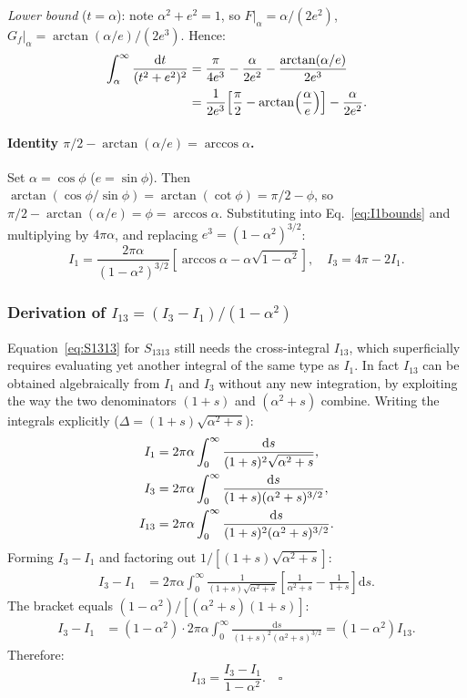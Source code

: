 \documentclass[5p,sort&compress]{elsarticle}
\begin{document}
\textit{Lower bound} ($t=\alpha$): note $\alpha^2+e^2=1$, so
$F|_\alpha=\alpha/(2e^2)$,
$G_f|_\alpha=\arctan(\alpha/e)/(2e^3)$. Hence:
\begin{align}
  \int_\alpha^\infty\frac{\mathrm dt}{(t^2+e^2)^2}
  &=\frac{\pi}{4e^3}-\frac{\alpha}{2e^2}
    -\frac{\arctan(\alpha/e)}{2e^3}\notag\\
  &=\frac{1}{2e^3}\!\left[\frac{\pi}{2}-\arctan\!\left(\frac{\alpha}{e}
    \right)\right]-\frac{\alpha}{2e^2}.
  \label{eq:I1bounds}
\end{align}

\paragraph{Identity $\pi/2-\arctan(\alpha/e)=\arccos\alpha$.}
Set $\alpha=\cos\phi$ ($e=\sin\phi$). Then
$\arctan(\cos\phi/\sin\phi)=\arctan(\cot\phi)=\pi/2-\phi$, so
$\pi/2-\arctan(\alpha/e)=\phi=\arccos\alpha$. Substituting into
Eq.~\eqref{eq:I1bounds} and multiplying by $4\pi\alpha$, and
replacing $e^3=(1-\alpha^2)^{3/2}$:
\begin{equation}
  \boxed{I_1=\frac{2\pi\alpha}{(1-\alpha^2)^{3/2}}
  \!\left[\arccos\alpha-\alpha\sqrt{1-\alpha^2}\right],\quad
  I_3=4\pi-2I_1.}
  \label{eq:I1result}
\end{equation}

\subsubsection{Derivation of $I_{13}=(I_3-I_1)/(1-\alpha^2)$}
\label{sec:I13}

Equation~\eqref{eq:S1313} for $S_{1313}$ still needs the
cross-integral $I_{13}$, which superficially requires evaluating yet
another integral of the same type as $I_1$. In fact $I_{13}$ can be
obtained algebraically from $I_1$ and $I_3$ without any new
integration, by exploiting the way the two denominators
$(1+s)$ and $(\alpha^2+s)$ combine. Writing the integrals explicitly
($\Delta=(1+s)\sqrt{\alpha^2+s}$):
\begin{align}
  I_1&=2\pi\alpha\int_0^\infty\frac{\mathrm ds}
    {(1+s)^2\sqrt{\alpha^2+s}},\notag\\
  I_3&=2\pi\alpha\int_0^\infty\frac{\mathrm ds}
    {(1+s)(\alpha^2+s)^{3/2}},\notag\\
  I_{13}&=2\pi\alpha\int_0^\infty\frac{\mathrm ds}
    {(1+s)^2(\alpha^2+s)^{3/2}}.\notag
\end{align}
Forming $I_3-I_1$ and factoring out $1/[(1+s)\sqrt{\alpha^2+s}]$:
\begin{align*}
  I_3-I_1&=2\pi\alpha\int_0^\infty\frac{1}{(1+s)\sqrt{\alpha^2+s}}
  \!\left[\frac{1}{\alpha^2+s}-\frac{1}{1+s}\right]\mathrm ds.
\end{align*}
The bracket equals $(1-\alpha^2)/[(\alpha^2{+}s)(1{+}s)]$:
\begin{align*}
  I_3-I_1&=(1-\alpha^2)\cdot2\pi\alpha\int_0^\infty
  \frac{\mathrm ds}{(1+s)^2(\alpha^2+s)^{3/2}}=(1-\alpha^2)I_{13}.
\end{align*}
Therefore:
\begin{equation}
  \boxed{I_{13}=\frac{I_3-I_1}{1-\alpha^2}.}\quad\square
  \label{eq:I13result}
\end{equation}
\end{document}
